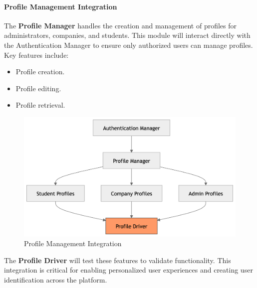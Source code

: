 \paragraph{Profile Management Integration}
The \textbf{Profile Manager} handles the creation and management of profiles for administrators, companies, and students. This module will interact directly with the Authentication Manager to ensure only authorized users can manage profiles. Key features include:
\begin{itemize}
    \item Profile creation.
    \item Profile editing.
    \item Profile retrieval.
\end{itemize}
\begin{figure}[H]
    \begin{center}
        \includegraphics[width=0.79\linewidth]{JhaBhatiaSharma/imagesDD/ProfileIntegration.png}
        \caption{Profile Management Integration}
        \label{fig:profileManagement}
    \end{center}
\end{figure}
The \textbf{Profile Driver} will test these features to validate functionality. This integration is critical for enabling personalized user experiences and creating user identification across the platform.

